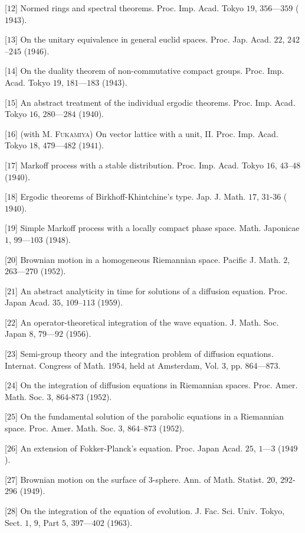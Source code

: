 [$12$] Normed rings and spectral theorems. Proc. Imp. Acad. Tokyo $19$, $356$---$359$ ($1943$). 

[$13$] On the unitary equivalence in general euclid spaces. Proc. Jap. Acad. $22$, $242$--$245$ ($1946$). 

[$14$] On the duality theorem of non-commutative compact groups. Proc. Imp. Acad. Tokyo $19$, $181$---$183$ ($1943$). 

[$15$] An abstract treatment of the individual ergodic theorems. Proc. Imp. Acad. Tokyo $16$, $280$---$284$ ($1940$). 

[$16$] (with M. \textsc{Fukamiya}) On vector lattice with a unit, II. Proc. Imp. Acad. Tokyo $18$, $479$---$482$ ($1941$). 

[$17$] Markoff process with a stable distribution. Proc. Imp. Acad. Tokyo $16$, $43$--$48$ ($1940$). 

[$18$] Ergodic theorems of Birkhoff-Khintchine's type. Jap. J. Math. $17$, $31$-$36$ ($1940$). 

[$19$] Simple Markoff process with a locally compact phase space. Math. Japonicae $1$, $99$---$103$ ($1948$). 

[$20$] Brownian motion in a homogeneous Riemannian space. Pacific J. Math. $2$, $263$---$270$ ($1952$). 

[$21$] An abstract analyticity in time for solutions of a diffusion equation. Proc. Japan Acad. $35$, $109$--$113$ ($1959$). 

[$22$] An operator-theoretical integration of the wave equation. J. Math. Soc. Japan $8$, $79$---$92$ ($1956$). 

[$23$] Semi-group theory and the integration problem of diffusion equations. Internat. Congress of Math. $1954$, held at Amsterdam, Vol. $3$, pp. $864$---$873$. 

[$24$] On the integration of diffusion equations in Riemannian spaces. Proc. Amer. Math. Soc. $3$, $864$-$873$ ($1952$). 

[$25$] On the fundamental solution of the parabolic equations in a Riemannian space. Proc. Amer. Math. Soc. $3$, $864$--$873$ ($1952$). 

[$26$] An extension of Fokker-Planck's equation. Proc. Japan Acad. $25$, $1$---$3$ ($1949$). 

[$27$] Brownian motion on the surface of $3$-sphere. Ann. of Math. Statist. $20$, $292$-$296$ ($1949$). 

[$28$] On the integration of the equation of evolution. J. Fac. Sci. Univ. Tokyo, Sect. $1$, $9$, Part $5$, $397$---$402$ ($1963$). 

